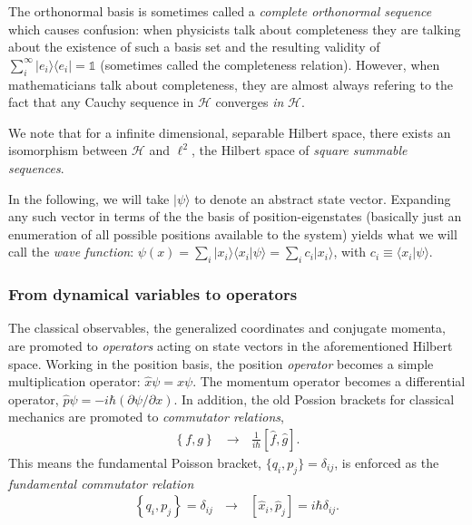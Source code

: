 \documentclass[../../master.tex]{subfiles}
\begin{document}
The orthonormal basis is sometimes called a \emph{complete orthonormal sequence} \cite{rynne} which causes confusion: when physicists talk about completeness they are talking about the existence of such a basis set and the resulting validity of $\sum_i^\infty |e_i\rangle\langle e_i|=\mathds{1}$ (sometimes called the completeness relation). However, when mathematicians talk about completeness, they are almost always refering to the fact that any Cauchy sequence in $\mathcal{H}$ converges \emph{in} $\mathcal{H}$.

We note that for a infinite dimensional, separable Hilbert space, there exists an isomorphism between $\mathcal H$ and $\ell^2$, the Hilbert space of \emph{square summable sequences}. 

In the following, we will take $|\psi\rangle$ to denote an abstract state vector. Expanding any such vector in terms of the the basis of position-eigenstates (basically just an enumeration of all possible positions available to the system) yields what we will call the \emph{wave function}: $\psi(x)=\sum_i|x_i\rangle  \langle x_i | \psi \rangle = \sum_i c_i |x_i\rangle$, with $c_i\equiv \langle x_i|\psi\rangle$.

\subsubsection{From dynamical variables to operators}
The classical observables, the generalized coordinates and conjugate momenta, are promoted to \emph{operators} acting on state vectors in the aforementioned Hilbert space. Working in the position basis, the position \emph{operator} becomes a simple multiplication operator: $\hat x \psi = x\psi$. The momentum operator becomes a differential operator, $\hat p \psi= -i\hbar (\partial \psi / \partial  x)$. In addition, the old Possion brackets for classical mechanics are promoted to \emph{commutator relations},
\begin{align}
\left\{ f, g \right\} \ \ \  \rightarrow \ \ \  \frac{1}{i \hbar }\left[ \hat f, \hat g \right].
\end{align}
This means the fundamental Poisson bracket, $\{q_i,p_j\}=\delta_{ij}$, is enforced as the \emph{fundamental commutator relation}
\begin{align}
\left\{ q_i, p_j \right\}=\delta_{ij} \ \ \ \rightarrow \ \ \ \left[ \hat x_i, \hat p_j \right] = i\hbar \delta_{ij}.
\end{align}
\end{document}
